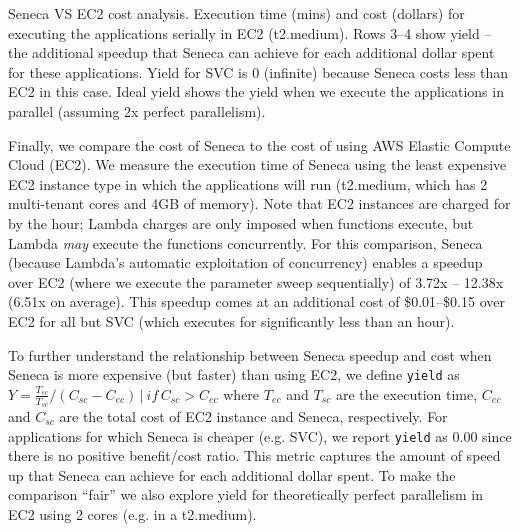 \begin{table}
\centering

\caption{Seneca VS EC2 cost analysis. Execution time (mins) and cost (dollars) for
executing the applications serially in EC2 (t2.medium).  
Rows 3--4 show yield -- the additional speedup that
Seneca can achieve for each additional dollar spent for these applications.
Yield for SVC is 0 (infinite) because Seneca costs less than EC2 in this case.
Ideal yield shows the yield when we execute the applications in parallel (assuming
2x perfect parallelism).
\label{tab:yield}}
\vspace{-0.1in}
\end{table}

Finally, we compare the cost of Seneca to the cost of using AWS Elastic Compute Cloud (EC2). 
We measure the execution time of Seneca using the
least expensive EC2 instance type in which the applications will run
(t2.medium, which has 2 multi-tenant cores and 4GB of memory). 
Note that EC2 instances are charged for by the hour; Lambda charges 
are only imposed when functions execute, but Lambda \textit{may} execute
the functions concurrently. 
For this comparison, Seneca (because Lambda's automatic exploitation of
concurrency) enables a speedup over EC2 (where we execute the parameter sweep
sequentially) 
of 3.72x -- 12.38x (6.51x on average). This speedup comes at an additional 
cost of \$0.01--\$0.15 over EC2 for all but SVC (which executes for
significantly less than an hour). 

To further understand the relationship between Seneca speedup and cost when Seneca
is more expensive (but faster) than using EC2, we define \texttt{yield} as 
$Y=\frac{T_{ec}}{T_{sc}}/({C_{sc} - C_{ec}}) \,|\ if \,C_{sc} > C_{ec}$ where $T_{ec}$ and $T_{sc}$ are the execution time, $C_{ec}$ and $C_{sc}$ are the total cost of EC2 instance 
and Seneca, respectively.
For applications for which Seneca is cheaper (e.g. SVC), we report \texttt{yield} 
as $0.00$ since there is no positive benefit/cost ratio.  This metric captures
the amount of speed up that Seneca can achieve 
for each additional dollar spent.  To make the comparison ``fair''
we also explore yield for theoretically perfect parallelism in EC2 using 2
cores (e.g. in a t2.medium).

